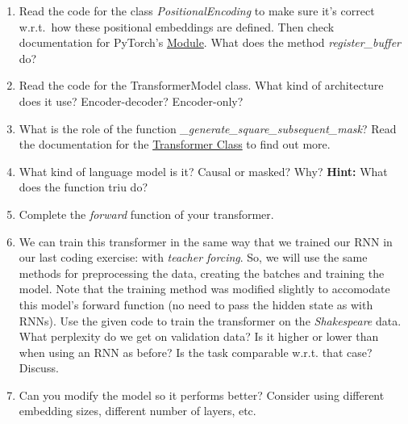 \documentclass[11pt,a4paper]{article}
\begin{document}
\begin{enumerate}[label=(\alph*)]
    \item Read the code for the class \emph{PositionalEncoding} to make sure
          it's correct w.r.t.\ how these positional embeddings are defined.
          Then check documentation for PyTorch's
          \href{https://pytorch.org/docs/stable/generated/torch.nn.Module.html}{Module}.
          What does the method \emph{register\_buffer} do?
    \item Read the code for the TransformerModel class. What kind of
          architecture does it use? Encoder-decoder? Encoder-only?
    \item What is the role of the function
          \emph{\_generate\_square\_subsequent\_mask}? Read the documentation
          for the
          \href{https://pytorch.org/docs/stable/generated/torch.nn.TransformerEncoder.html}{Transformer Class}
          to find out more.
    \item What kind of language model is it? Causal or masked? Why?
          \textbf{Hint:} What does the function triu do?
    \item Complete the \emph{forward} function of your transformer.
    \item We can train this transformer in the same way that we trained our RNN
          in our last coding exercise: with \emph{teacher forcing}.
          So, we will use the same methods for preprocessing the data, creating
          the batches and training the model.
          Note that the training method was modified slightly to accomodate this
          model's forward function (no need to pass the hidden state as with
          RNNs).
          Use the given code to train the transformer on the \emph{Shakespeare}
          data.
          What perplexity do we get on validation data?
          Is it higher or lower than when using an RNN as before?
          Is the task comparable w.r.t. that case? Discuss.
    \item Can you modify the model so it performs better? Consider using
          different embedding sizes, different number of layers, etc.
\end{enumerate}
\end{document}
